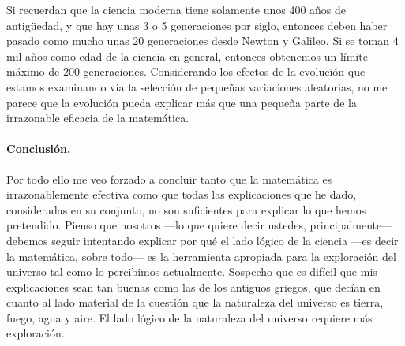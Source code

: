 \documentclass[a4paper, 12pt]{article}
\begin{document}
 

Si recuerdan que la ciencia moderna tiene solamente unos 400 años de antigüedad, y que hay unas 3 o 5 generaciones por siglo, entonces deben haber pasado como mucho unas 20 generaciones desde Newton y Galileo. Si se toman 4 mil años como edad de la ciencia en general, entonces obtenemos un límite máximo de 200 generaciones. Considerando los efectos de la evolución que estamos examinando vía la selección de pequeñas variaciones aleatorias,  no me parece que la evolución pueda explicar más que una pequeña parte de la irrazonable eficacia de la matemática.

 

\paragraph*{Conclusión.} Por todo ello me veo forzado a concluir tanto que la matemática es irrazonablemente efectiva como que todas las explicaciones que he dado, consideradas en su conjunto, no son suficientes para explicar lo que hemos pretendido. Pienso que nosotros ---lo que quiere decir ustedes, principalmente--- debemos seguir intentando explicar por qué el lado lógico de la ciencia ---es decir la matemática, sobre todo--- es la herramienta apropiada para la exploración del universo tal como lo percibimos actualmente. Sospecho que es difícil que mis explicaciones sean tan buenas como las de los antiguos griegos, que decían en cuanto al lado material de la cuestión que la naturaleza del universo es tierra, fuego, agua y aire. El lado lógico de la naturaleza del universo requiere más exploración.
\end{document}
